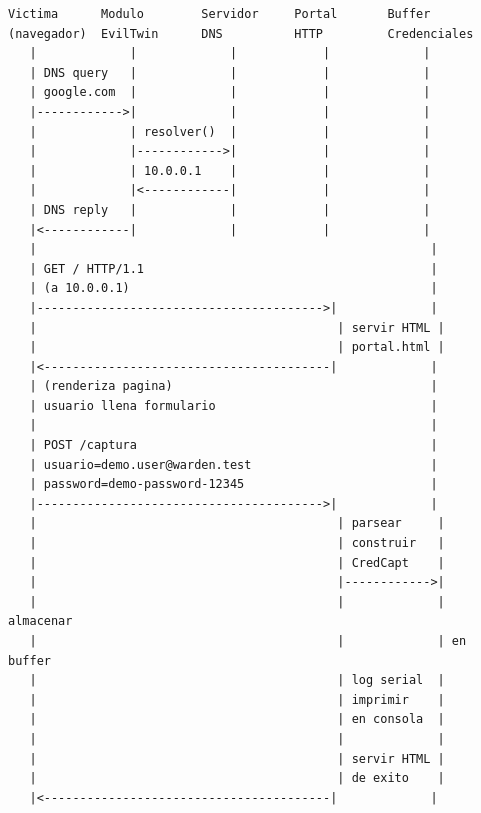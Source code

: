 \documentclass[11pt,a4paper]{article}
\begin{document}
\vspace{0.3cm}
\begin{verbatim}
Victima      Modulo        Servidor     Portal       Buffer
(navegador)  EvilTwin      DNS          HTTP         Credenciales
   |             |             |            |             |
   | DNS query   |             |            |             |
   | google.com  |             |            |             |
   |------------>|             |            |             |
   |             | resolver()  |            |             |
   |             |------------>|            |             |
   |             | 10.0.0.1    |            |             |
   |             |<------------|            |             |
   | DNS reply   |             |            |             |
   |<------------|             |            |             |
   |                                                       |
   | GET / HTTP/1.1                                        |
   | (a 10.0.0.1)                                          |
   |---------------------------------------->|             |
   |                                          | servir HTML |
   |                                          | portal.html |
   |<----------------------------------------|             |
   | (renderiza pagina)                                    |
   | usuario llena formulario                              |
   |                                                       |
   | POST /captura                                         |
   | usuario=demo.user@warden.test                         |
   | password=demo-password-12345                          |
   |---------------------------------------->|             |
   |                                          | parsear     |
   |                                          | construir   |
   |                                          | CredCapt    |
   |                                          |------------>|
   |                                          |             | almacenar
   |                                          |             | en buffer
   |                                          | log serial  |
   |                                          | imprimir    |
   |                                          | en consola  |
   |                                          |             |
   |                                          | servir HTML |
   |                                          | de exito    |
   |<----------------------------------------|             |
\end{verbatim}
\end{document}
